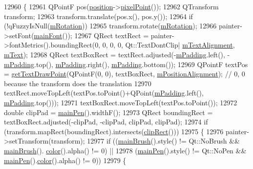 \begin{DoxyCode}
12960 \{
12961   QPointF pos(\hyperlink{a00041_a0d228a00e819022b5690c65762721129}{position}->\hyperlink{a00038_ae490f9c76ee2ba33752c495d3b6e8fb5}{pixelPoint}());
12962   QTransform transform;
12963   transform.translate(pos.x(), pos.y());
12964   \textcolor{keywordflow}{if} (!qFuzzyIsNull(\hyperlink{a00041_ac37df0061552225d2277e1ee3b48f2cb}{mRotation}))
12965     transform.rotate(\hyperlink{a00041_ac37df0061552225d2277e1ee3b48f2cb}{mRotation});
12966   painter->setFont(\hyperlink{a00041_a23d391bd6471c45e73f45add67ede902}{mainFont}());
12967   QRect textRect = painter->fontMetrics().boundingRect(0, 0, 0, 0, Qt::TextDontClip|
      \hyperlink{a00041_acdb2e50c38e83da00f083771efbd213f}{mTextAlignment}, \hyperlink{a00041_a2dec3e08c11f51639629374ecec3bd62}{mText});
12968   QRect textBoxRect = textRect.adjusted(-\hyperlink{a00041_ae7b3ef0ce6046efd4b346d28f2e1fb67}{mPadding}.left(), -\hyperlink{a00041_ae7b3ef0ce6046efd4b346d28f2e1fb67}{mPadding}.top(), 
      \hyperlink{a00041_ae7b3ef0ce6046efd4b346d28f2e1fb67}{mPadding}.right(), \hyperlink{a00041_ae7b3ef0ce6046efd4b346d28f2e1fb67}{mPadding}.bottom());
12969   QPointF textPos = \hyperlink{a00041_aa6e478b1ce198eace89157c4cacc3ddc}{getTextDrawPoint}(QPointF(0, 0), textBoxRect, 
      \hyperlink{a00041_a6c27f7dc1a962a04b32430cf99f04654}{mPositionAlignment}); \textcolor{comment}{// 0, 0 because the transform does the translation}
12970   textRect.moveTopLeft(textPos.toPoint()+QPoint(\hyperlink{a00041_ae7b3ef0ce6046efd4b346d28f2e1fb67}{mPadding}.left(), 
      \hyperlink{a00041_ae7b3ef0ce6046efd4b346d28f2e1fb67}{mPadding}.top()));
12971   textBoxRect.moveTopLeft(textPos.toPoint());
12972   \textcolor{keywordtype}{double} clipPad = \hyperlink{a00041_a9ade32d362b22853659201c738269e2a}{mainPen}().widthF();
12973   QRect boundingRect = textBoxRect.adjusted(-clipPad, -clipPad, clipPad, clipPad);
12974   \textcolor{keywordflow}{if} (transform.mapRect(boundingRect).intersects(\hyperlink{a00022_a538e25ff8856534582f5b2b400a46405}{clipRect}()))
12975   \{
12976     painter->setTransform(transform);
12977     \textcolor{keywordflow}{if} ((\hyperlink{a00041_a10d6585a030633aa79d5ebc5a437f183}{mainBrush}().style() != Qt::NoBrush && \hyperlink{a00041_a10d6585a030633aa79d5ebc5a437f183}{mainBrush}().
      \hyperlink{a00041_ac9cb0a8a27f64d1b40855910ea9ebd03}{color}().alpha() != 0) ||
12978         (\hyperlink{a00041_a9ade32d362b22853659201c738269e2a}{mainPen}().style() != Qt::NoPen && \hyperlink{a00041_a9ade32d362b22853659201c738269e2a}{mainPen}().\hyperlink{a00041_ac9cb0a8a27f64d1b40855910ea9ebd03}{color}().alpha() != 0))
12979     \{

\end{DoxyCode}
